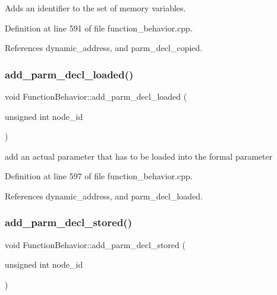 Adds an identifier to the set of memory variables. 



Definition at line 591 of file function\+\_\+behavior.\+cpp.



References dynamic\+\_\+address, and parm\+\_\+decl\+\_\+copied.

\mbox{\label{classFunctionBehavior_a437de4136f7ccf99af99a9e87d2187e1}} 
\subsubsection{\texorpdfstring{add\+\_\+parm\+\_\+decl\+\_\+loaded()}{add\_parm\_decl\_loaded()}}
{\footnotesize\ttfamily void Function\+Behavior\+::add\+\_\+parm\+\_\+decl\+\_\+loaded (\begin{DoxyParamCaption}\item[{unsigned int}]{node\+\_\+id }\end{DoxyParamCaption})}



add an actual parameter that has to be loaded into the formal parameter 



Definition at line 597 of file function\+\_\+behavior.\+cpp.



References dynamic\+\_\+address, and parm\+\_\+decl\+\_\+loaded.

\mbox{\label{classFunctionBehavior_acaf8196ed294be7d3e70f3ccad5044a5}} 
\subsubsection{\texorpdfstring{add\+\_\+parm\+\_\+decl\+\_\+stored()}{add\_parm\_decl\_stored()}}
{\footnotesize\ttfamily void Function\+Behavior\+::add\+\_\+parm\+\_\+decl\+\_\+stored (\begin{DoxyParamCaption}\item[{unsigned int}]{node\+\_\+id }\end{DoxyParamCaption})}



